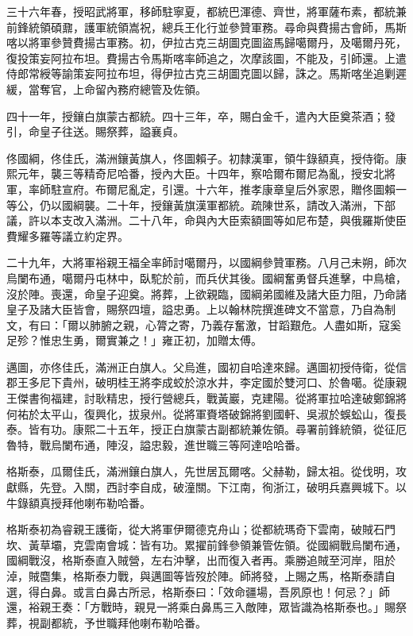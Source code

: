 \begin{pinyinscope}
三十六年春，授昭武將軍，移師駐寧夏，都統巴渾德、齊世，將軍薩布素，都統兼前鋒統領碩鼐，護軍統領嵩祝，總兵王化行並參贊軍務。尋命與費揚古會師，馬斯喀以將軍參贊費揚古軍務。初，伊拉古克三胡圖克圖盜馬歸噶爾丹，及噶爾丹死，復投策妄阿拉布坦。費揚古令馬斯喀率師追之，次摩該圖，不能及，引師還。上遣侍郎常綬等諭策妄阿拉布坦，得伊拉古克三胡圖克圖以歸，誅之。馬斯喀坐追剿遲緩，當奪官，上命留內務府總管及佐領。

四十一年，授鑲白旗蒙古都統。四十三年，卒，賜白金千，遣內大臣奠茶酒；發引，命皇子往送。賜祭葬，謚襄貞。

佟國綱，佟佳氏，滿洲鑲黃旗人，佟圖賴子。初隸漢軍，領牛錄額真，授侍衛。康熙元年，襲三等精奇尼哈番，授內大臣。十四年，察哈爾布爾尼為亂，授安北將軍，率師駐宣府。布爾尼亂定，引還。十六年，推孝康章皇后外家恩，贈佟圖賴一等公，仍以國綱襲。二十年，授鑲黃旗漢軍都統。疏陳世系，請改入滿洲，下部議，許以本支改入滿洲。二十八年，命與內大臣索額圖等如尼布楚，與俄羅斯使臣費耀多羅等議立約定界。

二十九年，大將軍裕親王福全率師討噶爾丹，以國綱參贊軍務。八月己未朔，師次烏闌布通，噶爾丹屯林中，臥駝於前，而兵伏其後。國綱奮勇督兵進擊，中鳥槍，沒於陣。喪還，命皇子迎奠。將葬，上欲親臨，國綱弟國維及諸大臣力阻，乃命諸皇子及諸大臣皆會，賜祭四壇，謚忠勇。上以翰林院撰進碑文不當意，乃自為制文，有曰：「爾以肺腑之親，心膂之寄，乃義存奮激，甘蹈艱危。人盡如斯，寇奚足殄？惟忠生勇，爾實兼之！」雍正初，加贈太傅。

邁圖，亦佟佳氏，滿洲正白旗人。父烏進，國初自哈達來歸。邁圖初授侍衛，從信郡王多尼下貴州，破明桂王將李成蛟於涼水井，李定國於雙河口、於魯噶。從康親王傑書徇福建，討耿精忠，授行營總兵，戰黃巖，克建陽。從將軍拉哈達破鄭錦將何祐於太平山，復興化，拔泉州。從將軍賚塔破錦將劉國軒、吳淑於蜈蚣山，復長泰。皆有功。康熙二十五年，授正白旗蒙古副都統兼佐領。尋署前鋒統領，從征厄魯特，戰烏闌布通，陣沒，謚忠毅，進世職三等阿達哈哈番。

格斯泰，瓜爾佳氏，滿洲鑲白旗人，先世居瓦爾喀。父赫勒，歸太祖。從伐明，攻獻縣，先登。入關，西討李自成，破潼關。下江南，徇浙江，破明兵嘉興城下。以牛錄額真授拜他喇布勒哈番。

格斯泰初為睿親王護衛，從大將軍伊爾德克舟山；從都統瑪奇下雲南，破賊石門坎、黃草壩，克雲南會城：皆有功。累擢前鋒參領兼管佐領。從國綱戰烏闌布通，國綱戰沒，格斯泰直入賊營，左右沖擊，出而復入者再。乘勝追賊至河岸，阻於淖，賊麕集，格斯泰力戰，與邁圖等皆歿於陣。師將發，上賜之馬，格斯泰請自選，得白鼻。或言白鼻古所忌，格斯泰曰：「效命疆場，吾夙原也！何忌？」師還，裕親王奏：「方戰時，親見一將乘白鼻馬三入敵陣，眾皆識為格斯泰也。」賜祭葬，視副都統，予世職拜他喇布勒哈番。


\end{pinyinscope}
